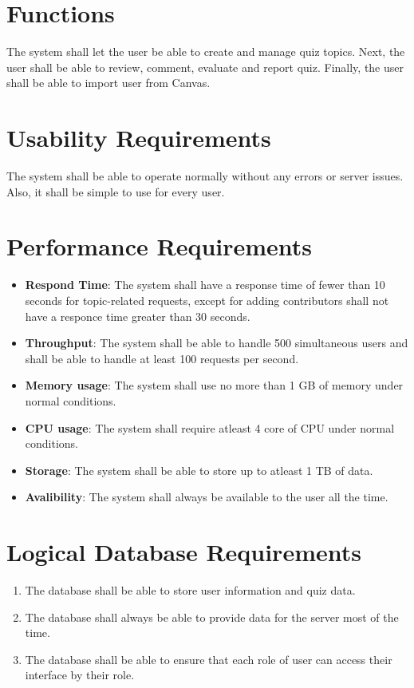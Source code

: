 \documentclass[ 10pt]{report}
\begin{document}
        \section{Functions}
        The system shall let the user be able to create and manage quiz topics. Next, the user shall be able to review, comment, evaluate and report quiz. Finally, the user shall be able to import user from Canvas.
        \section{Usability Requirements}
        The system shall be able to operate normally without any errors or server issues. Also, it shall be simple to use for every user.
        \section{Performance Requirements}
        \begin{itemize}
        \item \textbf{Respond Time}: The system shall have a response time of fewer than 10 seconds for topic-related requests, except for adding contributors shall not have a responce time greater than 30 seconds.  
        \item \textbf{Throughput}: The system shall be able to handle 500 simultaneous users and shall be able to handle at least 100 requests per second.
        \item \textbf{Memory usage}: The system shall use no more than 1 GB of memory under normal conditions. 
        \item \textbf{CPU usage}: The system shall require atleast 4 core of CPU under normal conditions.
        \item \textbf{Storage}: The system shall be able to store up to atleast 1 TB of data.
        \item \textbf{Avalibility}: The system shall always be available to the user all the time.
        \end{itemize}
        \section{Logical Database Requirements}
        \begin{enumerate}
            \item The database shall be able to store user information and quiz data.
            \item The database shall always be able to provide data for the server most of the time.
            \item The database shall be able to ensure that each role of user can access their interface by their role.
        \end{enumerate}
\end{document}
